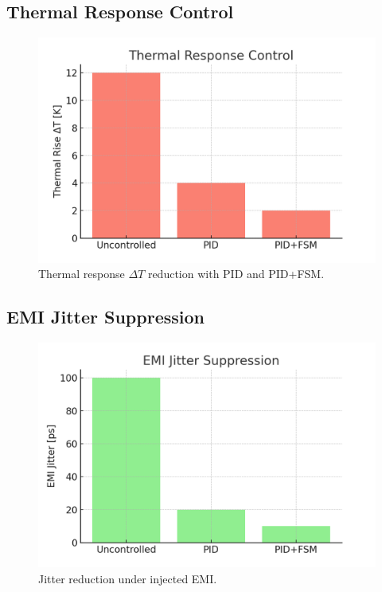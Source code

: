 \documentclass[conference]{IEEEtran}
\begin{document}
\subsection{Thermal Response Control}
\begin{figure}[!t]
\centering
\includegraphics[width=.95\columnwidth]{figs/sim_thermal_response.png}
\caption{Thermal response $\Delta T$ reduction with PID and PID+FSM.}
\label{fig:thermal}
\end{figure}

\subsection{EMI Jitter Suppression}
\begin{figure}[!t]
\centering
\includegraphics[width=.95\columnwidth]{figs/sim_emi_jitter.png}
\caption{Jitter reduction under injected EMI.}
\label{fig:emi}
\end{figure}
\end{document}
